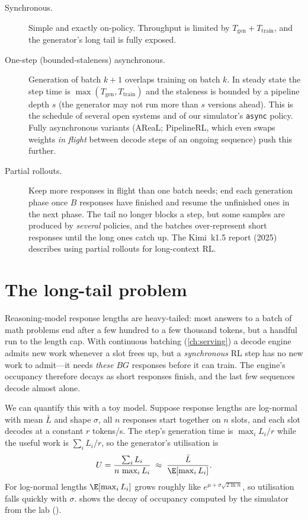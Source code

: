 \begin{description}
\item[Synchronous.] Simple and exactly on-policy. Throughput is limited by
$T_{\text{gen}}+T_{\text{train}}$, and the generator's long tail is fully exposed.
\item[One-step (bounded-staleness) asynchronous.] Generation of batch $k+1$ overlaps training
on batch $k$. In steady state the step time is $\max(T_{\text{gen}},T_{\text{train}})$ and the
staleness is bounded by a pipeline depth $s$ (the generator may not run more than $s$ versions
ahead). This is the schedule of several open systems and of our simulator's \texttt{async}
policy. Fully asynchronous variants (AReaL; PipelineRL, which even swaps weights
\emph{in flight} between decode steps of an ongoing sequence) push this further.
\item[Partial rollouts.] Keep more responses in flight than one batch needs; end each
generation phase once $B$ responses have finished and resume the unfinished ones in the next
phase. The tail no longer blocks a step, but some samples are produced by \emph{several}
policies, and the batches over-represent short responses until the long ones catch up. The
Kimi~k1.5 report (2025) describes using partial rollouts for long-context RL.
\end{description}

\section{The long-tail problem}\label{sec:rlsys:tail}

Reasoning-model response lengths are heavy-tailed: most answers to a batch of math problems
end after a few hundred to a few thousand tokens, but a handful run to the length cap. With
continuous batching (\cref{ch:serving}) a decode engine admits new work whenever a slot frees
up, but a \emph{synchronous} RL step has no new work to admit---it needs \emph{these}
$BG$ responses before it can train. The engine's occupancy therefore decays as short
responses finish, and the last few sequences decode almost alone.

We can quantify this with a toy model. Suppose response lengths are log-normal with mean
$\bar L$ and shape $\sigma$, all $n$ responses start together on $n$ slots, and each slot
decodes at a constant $r$ tokens/s. The step's generation time is $\max_i L_i/r$ while the
useful work is $\sum_i L_i/r$, so the generator's utilisation is
\begin{equation}
U = \frac{\sum_i L_i}{n\,\max_i L_i} \;\approx\; \frac{\bar L}{\E[\max_i L_i]}.
\end{equation}
For log-normal lengths $\E[\max_i L_i]$ grows roughly like $e^{\mu + \sigma\sqrt{2\ln n}}$, so
utilisation falls quickly with $\sigma$.  shows the decay of
occupancy computed by the simulator from the lab ().

